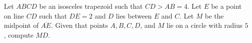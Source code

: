 Let $A B C D$ be an isosceles trapezoid such that $C D>A B=4$. Let $E$ be a point on line $C D$ such that $D E=2$ and $D$ lies between $E$ and $C$. Let $M$ be the midpoint of $\overline{A E}$. Given that points $A, B, C, D$, and $M$ lie on a circle with radius $5$, compute $M D$.